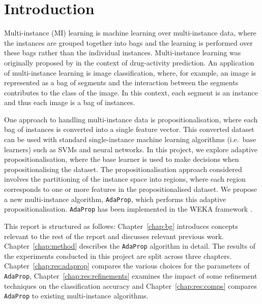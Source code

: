 \documentclass[a4paper,12pt]{report} %
\newcommand{\AdaProp}{\texttt{AdaProp}\xspace}
\begin{document}
\tableofcontents

\listoffigures

\chapter{Introduction}
\label{chap:intro}

Multi-instance (MI) learning is 
    machine learning over multi-instance data, 
    where the instances are grouped together into bags and 
    the learning is performed over these bags 
    rather than the individual instances.
Multi-instance learning was originally proposed 
    by  in the context of drug-activity prediction.
An application of multi-instance learning is image classification,
    where, for example, 
    an image is represented as a bag of segments and 
    the interaction between the segments contributes 
    to the class of the image. 
In this context, 
    each segment is an instance and 
    thus each image is a bag of instances.    
    
One approach to handling multi-instance data is propositionalisation, 
    where each bag of instances is converted into 
    a single feature vector. 
This converted dataset can be used with 
    standard single-instance machine learning algorithms (i.e.\ base learners)
    such as SVMs and neural networks.
In this project, we explore adaptive propositionalisation, 
    where the base learner is used to 
    make decisions when propositionalising the dataset. 
The propositionalisation approach considered involves the 
    partitioning of the instance space into regions, 
    where each region corresponds to 
    one or more features in the propositionalised dataset.
We propose a new multi-instance algorithm, \AdaProp, which 
	performs this adaptive propositionalisation.
\AdaProp has been
	implemented in the WEKA framework \cite{weka}.
 
This report is structured as follows:
	Chapter~\ref{chap:bg} introduces concepts relevant to the rest of 
	the report and discusses relevant previous work.
Chapter~\ref{chap:method} describes the \AdaProp algorithm in detail.
The results of the experiments conducted in this project 
	are split across three chapters.
Chapter~\ref{chap:res:adaprop} compares the various choices for 
	the parameters of \AdaProp, 
Chapter~\ref{chap:res:refinements} examines the impact of some 
	refinement techniques on the classification accuracy and 
Chapter~\ref{chap:res:comps} compares \AdaProp to existing
	multi-instance algorithms.
\end{document}
